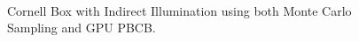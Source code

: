 \begin{figure}[h!]
    \centering
    ~
    \caption[Cornell Box comparison]{Cornell Box with Indirect Illumination using both Monte Carlo Sampling and GPU PBCB.}
    \label{fig:compare_techniques}
\end{figure}

